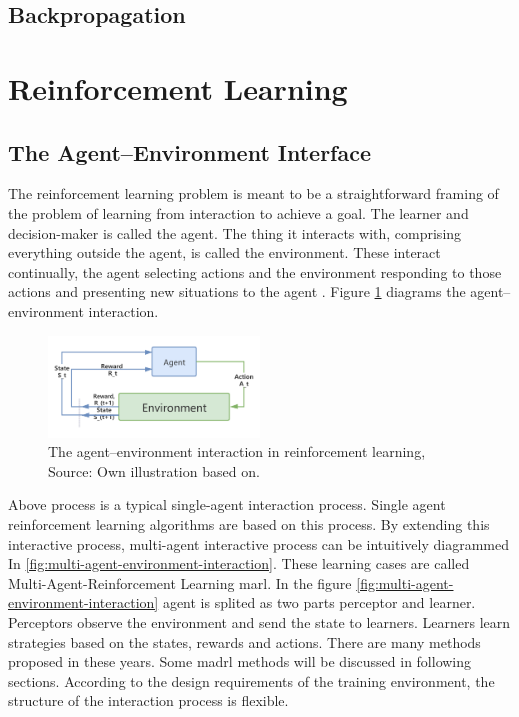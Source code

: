 \subsection{Backpropagation}

\section{Reinforcement Learning}
\subsection{The Agent–Environment Interface}
The reinforcement learning problem is meant to be a straightforward framing
of the problem of learning from interaction to achieve a goal. The learner and
decision-maker is called the agent. The thing it interacts with, comprising
everything outside the agent, is called the environment. These interact continually, the agent selecting actions and the environment responding to those
actions and presenting new situations to the agent \parencite{Sutton2018}. 
Figure \ref{fig:agent-environment-interaction} diagrams the agent–environment interaction.

\begin{figure}[htbp]
\centering
\includegraphics[width=0.5\textwidth]{./images/agent-environment-interaction.png}
\caption{The agent–environment interaction in reinforcement learning, Source: Own illustration based
on\parencite{Sutton2018}.}
\label{fig:agent-environment-interaction}
\end{figure}

Above process is a typical single-agent interaction process. Single agent reinforcement learning algorithms are based on this process. By extending this interactive process, multi-agent interactive process can be intuitively diagrammed In \ref{fig:multi-agent-environment-interaction}. These learning cases are called Multi-Agent-Reinforcement Learning \gls{marl}. In the figure \ref{fig:multi-agent-environment-interaction} agent is splited as two parts perceptor and learner. Perceptors observe the environment and send the state to learners. Learners learn strategies based on the states, rewards and actions. There are many methods proposed in these years. Some \gls{madrl} methods will be discussed in following sections. According to the design requirements of the training environment, the structure of the interaction process is flexible.

